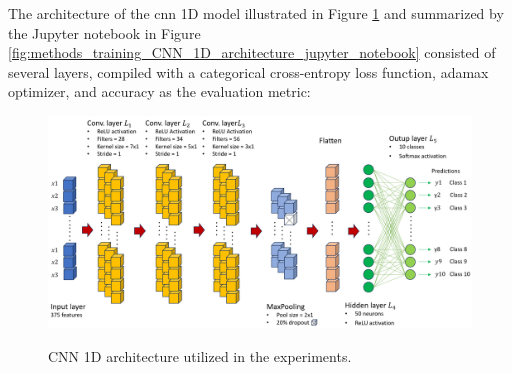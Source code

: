 The architecture of the \gls{cnn} 1D model illustrated in Figure \ref{fig:methods_training_CNN_1D_architecture} and summarized by the Jupyter notebook in Figure \ref{fig:methods_training_CNN_1D_architecture_jupyter_notebook} consisted of several layers, compiled with a categorical cross-entropy loss function, adamax optimizer, and accuracy as the evaluation metric:

\begin{figure}[htbp]
    \raggedright
        \caption{CNN 1D architecture utilized in the experiments.}
        \includegraphics[width=1\textwidth]{resources/images/050-methods/Methods_training_CNN1D_architecture.png}
        \label{fig:methods_training_CNN_1D_architecture}
\end{figure} 

